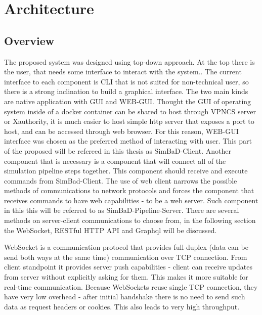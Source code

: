 \chapter{Architecture}
\section{Overview}
The proposed system was designed using top-down approach. At the top there is the user, that needs some interface to interact with the system.. The current interface to each component is CLI that is not suited for non-technical user, so there is a strong inclination to build a graphical interface. The two main kinds are native application with GUI and WEB-GUI. Thought the GUI of operating system inside of a docker container can be shared to host through VPNCS server or Xauthority, it is much easier to host simple http server that exposes a port to host, and can be accessed through web browser. For this reason, WEB-GUI interface was chosen as the preferred method of interacting with user. This part of the proposed will be refereed in this thesis as SimBaD-Client.
Another component that is necessary is a component that will connect all of the simulation pipeline steps together. This component should receive and execute commands from SimBad-Client. The use of web client narrows the possible methods of communications to network protocols and forces the component that receives commands to have web capabilities - to be a web server. Such component in this this will be referred to as SimBaD-Pipeline-Server. 
There are several methods on server-client communications to choose from, in the following section the WebSocket, RESTful HTTP API and Graphql will be discussed.

WebSocket is a communication protocol that provides full-duplex (data can be send both ways at the same time) communication over TCP connection. From client standpoint it provides server push capabilities - client can receive updates from server without explicitly asking for them. This makes it more suitable for real-time communication. Because WebSockets reuse single TCP connection, they have very low overhead - after initial handshake there is no need to send such data as request headers or cookies. This also leads to very high throughput. 

